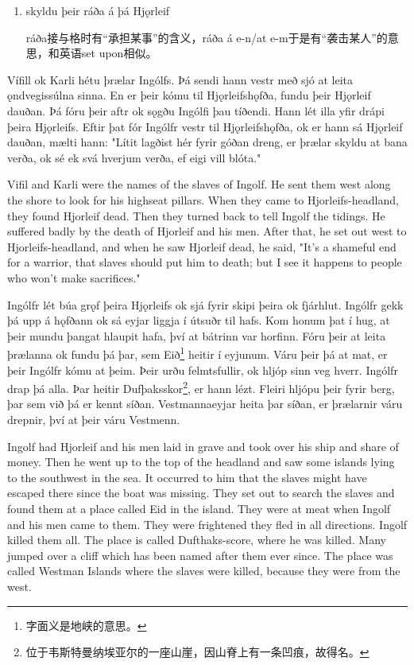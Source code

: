 \begin{grammar*}{}
    \begin{enumerate}[leftmargin=*]
        \item skyldu þeir ráða á þá Hjǫrleif

              ráða接与格时有“承担某事”的含义，ráða á e-n/at e-m于是有“袭击某人”的意思，和英语set upon相似。
    \end{enumerate}
\end{grammar*}

\begin{paracol}{2}
    Vífill ok Karli hétu þrælar Ingólfs. Þá sendi hann vestr með sjó at leita ǫndvegissúlna sinna. En er þeir kómu til Hjǫrleifshǫfða, fundu þeir Hjǫrleif dauðan. Þá fóru þeir aftr ok sǫgðu Ingólfi þau tíðendi. Hann lét illa yfir drápi þeira Hjǫrleifs. Eftir þat fór Ingólfr vestr til Hjǫrleifshǫfða, ok er hann sá Hjǫrleif dauðan, mælti hann: "Lítit lagðist hér fyrir góðan dreng, er þrælar skyldu at bana verða, ok sé ek svá hverjum verða, ef eigi vill blóta."
    \switchcolumn

    Vifil and Karli were the names of the slaves of Ingolf. He sent them west along the shore to look for his highseat pillars. When they came to Hjorleifs-headland, they found Hjorleif dead. Then they turned back to tell Ingolf the tidings. He suffered badly by the death of Hjorleif and his men. After that, he set out west to Hjorleifs-headland, and when he saw Hjorleif dead, he said, "It's a shameful end for a warrior, that slaves should put him to death; but I see it happens to people who won't make sacrifices."

    \switchcolumn*

    Ingólfr lét búa grǫf þeira Hjǫrleifs ok sjá fyrir skipi þeira ok fjárhlut. Ingólfr gekk þá upp á hǫfðann ok sá eyjar liggja í útsuðr til hafs. Kom honum þat í hug, at þeir mundu þangat hlaupit hafa, því at bátrinn var horfinn. Fóru þeir at leita þrælanna ok fundu þá þar, sem Eið\footnote{字面义是地峡的意思。} heitir í eyjunum. Váru þeir þá at mat, er þeir Ingólfr kómu at þeim. Þeir urðu felmtsfullir, ok hljóp sinn veg hverr. Ingólfr drap þá alla. Þar heitir Dufþaksskor\footnote{位于韦斯特曼纳埃亚尔的一座山崖，因山脊上有一条凹痕，故得名。}, er hann lézt. Fleiri hljópu þeir fyrir berg, þar sem við þá er kennt síðan. Vestmannaeyjar heita þar síðan, er þrælarnir váru drepnir, því at þeir váru Vestmenn.

    \switchcolumn

    Ingolf had Hjorleif and his men laid in grave and took over his ship and share of money. Then he went up to the top of the headland and saw some islands lying to the southwest in the sea. It occurred to him that the slaves might have escaped there since the boat was missing. They set out to search the slaves and found them at a place called Eid in the island. They were at meat when Ingolf and his men came to them. They were frightened they fled in all directions. Ingolf killed them all. The place is called Dufthaks-score, where he was killed. Many jumped over a cliff which has been named after them ever since. The place was called Westman Islands where the slaves were killed, because they were from the west.
\end{paracol}
